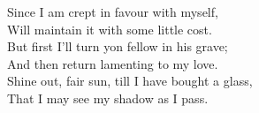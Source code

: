 \documentclass{article}
\begin{document}
\begin{description}
\hspace{1pt}Since I am crept in favour with myself,\\
\hspace{1pt}Will maintain it with some little cost.\\
\hspace{1pt}But first I'll turn yon fellow in his grave;\\
\hspace{1pt}And then return lamenting to my love.\\
\hspace{1pt}Shine out, fair sun, till I have bought a glass,\\
\hspace{1pt}That I may see my shadow as I pass.\\
\end{description}
\centering{\it [Exit]}\\
\end{document}
